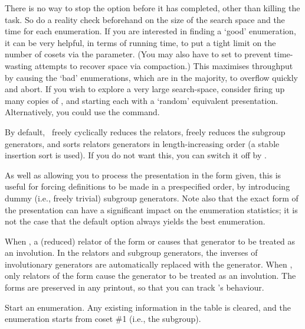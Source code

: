 There is no way to stop the  option before it has completed,
  other than killing the task.
So do a reality check beforehand on the size of the search space and the 
  time for each enumeration.
If you are interested in finding a `good' enumeration, it can be very
  helpful, in terms of running time, to put a tight limit on the number of
  cosets via the  parameter.
(You may also have to set  to prevent time-wasting attempts
  to recover space via compaction.)
This maximises throughput by causing the `bad' enumerations, which are in
  the majority, to overflow quickly and abort.
If you wish to explore a very large search-space, consider firing up many
  copies of \ace, and starting each with a `random' equivalent
  presentation.
Alternatively, you could use the  command.

\quad{}

By default, \ace\ freely \amp cyclically reduces the relators, freely
  reduces the subgroup generators, and sorts relators \amp generators
  in length-increasing order (a stable insertion sort is used).
If you do not want this, you can switch it off by .

As well as allowing you to process the presentation in the form given, this
  is useful for forcing definitions to be made in a prespecified order, by
  introducing dummy (i.e., freely trivial) subgroup generators.
Note also that the exact form of the presentation can have a significant
  impact on the enumeration statistics; it is not the case that the 
  default option always yields the best enumeration.

When , a (reduced) relator of the form  or  
  causes that generator to be treated as an involution.
In the relators and subgroup generators, the inverses of involutionary
  generators are automatically replaced with the generator.
When , only relators of the form  cause the 
  generator to be treated as an involution.
The forms  \amp {} are preserved in any printout, so
  that you can track \ace's behaviour.

\quad{}

Start an enumeration.
Any existing information in the table is cleared, and the enumeration
  starts from coset \#1 (i.e., the subgroup).

\quad{}

